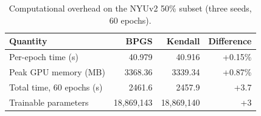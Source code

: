 \begin{table}[t]
\centering
\caption{Computational overhead on the NYUv2 50\% subset (three seeds, 60 epochs).}
\label{tab:overhead}
\small
\begin{tabular}{lrrr}
\toprule
Quantity & BPGS & Kendall & Difference \\
\midrule
Per-epoch time (s) & 40.979 & 40.916 & +0.15\% \\
Peak GPU memory (MB) & 3368.36 & 3339.34 & +0.87\% \\
Total time, 60 epochs (s) & 2461.6 & 2457.9 & +3.7 \\
Trainable parameters & 18,869,143 & 18,869,140 & +3 \\
\bottomrule
\end{tabular}
\end{table}

